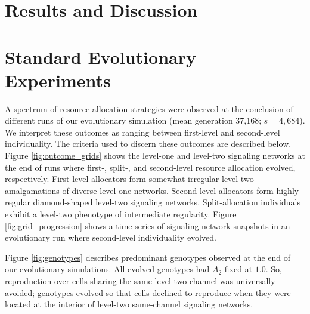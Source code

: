 \section{Results and Discussion}

\section{Standard Evolutionary Experiments}







A spectrum of resource allocation strategies were observed at the conclusion of different runs of our evolutionary simulation (mean generation 37,168; $s=4,684$).
We interpret these outcomes as ranging between first-level and second-level individuality.
The criteria used to discern these outcomes are described below.
Figure \ref{fig:outcome_grids} shows the level-one and level-two signaling networks at the end of runs where first-, split-, and second-level resource allocation evolved, respectively.
First-level allocators form somewhat irregular level-two amalgamations of diverse level-one networks.
Second-level allocators form highly regular diamond-shaped level-two signaling networks.
Split-allocation individuals exhibit a level-two phenotype of intermediate regularity.
Figure \ref{fig:grid_progression} shows a time series of signaling network snapshots in an evolutionary run where second-level individuality evolved.

Figure \ref{fig:genotypes} describes predominant genotypes observed at the end of our evolutionary simulations.
All evolved genotypes had $A_2$ fixed at $1.0$.
So, reproduction over cells sharing the same level-two channel was universally avoided;
genotypes evolved so that cells declined to reproduce when they were located at the interior of level-two same-channel signaling networks.

